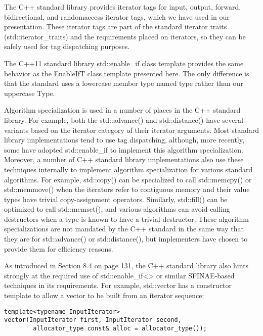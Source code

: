 The C++ standard library provides iterator tags for input, output, forward, bidirectional, and randomaccess iterator tags, which we have used in our presentation. These iterator tags are part of the standard iterator traits (std::iterator\_traits) and the requirements placed on iterators, so they can be safely used for tag dispatching purposes.

The C++11 standard library std::enable\_if class template provides the same behavior as the EnableIfT class template presented here. The only difference is that the standard uses a lowercase member type named type rather than our uppercase Type.

Algorithm specialization is used in a number of places in the C++ standard library. For example, both the std::advance() and std::distance() have several variants based on the iterator category of their iterator arguments. Most standard library implementations tend to use tag dispatching, although, more recently, some have adopted std::enable\_if to implement this algorithm specialization. Moreover, a number of C++ standard library implementations also use these techniques internally to implement algorithm specialization for various standard algorithms. For example, std::copy() can be specialized to call std::memcpy() or std::memmove() when the iterators refer to contiguous memory and their value types have trivial copy-assignment operators. Similarly, std::fill() can be optimized to call std::memset(), and various algorithms can avoid calling destructors when a type is known to have a trivial destructor. These algorithm specializations are not mandated by the C++ standard in the same way that they are for std::advance() or std::distance(), but implementers have chosen to provide them for efficiency reasons.

As introduced in Section 8.4 on page 131, the C++ standard library also hints strongly at the required use of std::enable\_if<> or similar SFINAE-based techniques in its requirements. For example, std::vector has a constructor template to allow a vector to be built from an iterator sequence:

\begin{lstlisting}[style=styleCXX]
template<typename InputIterator>
vector(InputIterator first, InputIterator second,
		allocator_type const& alloc = allocator_type());
\end{lstlisting}

